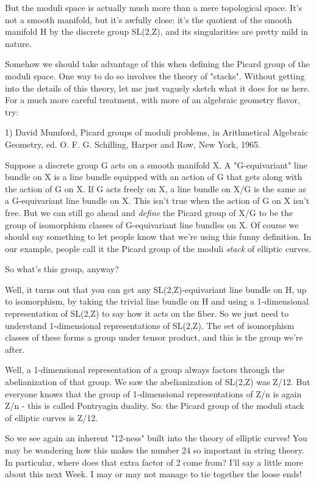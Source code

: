 But the moduli space is actually much more than a mere topological
space.  It's not a smooth manifold, but it's awfully close: it's the
quotient of the smooth manifold H by the discrete group SL(2,Z), and
its singularities are pretty mild in nature.  

Somehow we should take advantage of this when defining the Picard
group of the moduli space.  One way to do so involves the theory of
"stacks".  Without getting into the details of this theory, let me 
just vaguely sketch what it does for us here.  For a much more careful
treatment, with more of an algebraic geometry flavor, try:

1) David Mumford, Picard groups of moduli problems, in Arithmetical
Algebraic Geometry, ed. O. F. G. Schilling, Harper and Row, New York, 
1965.

Suppose a discrete group G acts on a smooth manifold X.  A
"G-equivariant" line bundle on X is a line bundle equipped with an
action of G that gets along with the action of G on X.  If G acts
freely on X, a line bundle on X/G is the same as a G-equivariant line
bundle on X.  This isn't true when the action of G on X isn't free.
But we can still go ahead and \emph{define} the Picard group of X/G to be
the group of isomorphism classes of G-equivariant line bundles on X.
Of course we should say something to let people know that we're using
this funny definition.  In our example, people call it the Picard
group of the moduli \emph{stack} of elliptic curves.

So what's this group, anyway?  

Well, it turns out that you can get any SL(2,Z)-equivariant line
bundle on H, up to isomorphism, by taking the trivial line bundle on H
and using a 1-dimensional representation of SL(2,Z) to say how it acts
on the fiber.  So we just need to understand 1-dimensional
representations of SL(2,Z).  The set of isomorphism classes of these
forms a group under tensor product, and this is the group we're after.

Well, a 1-dimensional representation of a group always factors through
the abelianization of that group.  We saw the abelianization of
SL(2,Z) was Z/12.  But everyone knows that the group of 1-dimensional
representations of Z/n is again Z/n - this is called Pontryagin duality.
So: the Picard group of the moduli stack of elliptic curves is Z/12. 

So we see again an inherent "12-ness" built into the theory of
elliptic curves!  You may be wondering how this makes the number 24 so
important in string theory.  In particular, where does that extra
factor of 2 come from?  I'll say a little more about this next Week.
I may or may not manage to tie together the loose ends!

